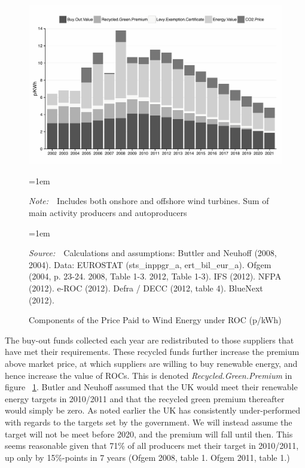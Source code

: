 \documentclass[a4paper, 12pt]{article}
\newcommand{\Figtext}[1]{%
	\begin{tablenotes}[para,flushleft]
		\hangindent=1em
		\footnotesize
		\raggedright
		#1
	\end{tablenotes}
}
\newcommand{\Fignote}[1]{\Figtext{\emph{Note:~}~#1}}
\newcommand{\Figsource}[1]{\Figtext{\emph{Source:~}~#1}}
\begin{document}
\begin{figure}
	\centering
	\caption{Components of the Price Paid to Wind Energy under ROC (p/kWh)}
	\includegraphics[width=1\textwidth]{figure_roc-price-components_gray}
	\Fignote{Includes both onshore and offshore wind turbines. Sum of main activity producers and autoproducers}
	\Figsource{Calculations and assumptions: Buttler and Neuhoff (2008, 2004). Data: EUROSTAT (sts\_inppgr\_a, ert\_bil\_eur\_a). Ofgem (2004, p. 23-24. 2008, Table 1-3. 2012, Table 1-3). IFS (2012). NFPA (2012). e-ROC (2012). Defra / DECC (2012, table 4). BlueNext (2012).}
	\label{fig:figure_roc-price-components}
\end{figure}

The buy-out funds collected each year are redistributed to those suppliers that have met their requirements. These recycled funds further increase the premium above market price, at which suppliers are willing to buy renewable energy, and hence increase the value of ROCs. This is denoted \emph{Recycled.Green.Premium} in figure ~\ref{fig:figure_roc-price-components}. Butler and Neuhoff assumed that the UK would meet their renewable energy targets in 2010/2011 and that the recycled green premium thereafter would simply be zero. As noted earlier the UK has consistently under-performed with regards to the targets set by the government. We will instead assume the target will not be meet before 2020, and the premium will fall until then. This seems reasonable given that 71\% of all producers met their target in 2010/2011, up only by 15\%-points in 7 years (Ofgem 2008, table 1. Ofgem 2011, table 1.) 
\end{document}
